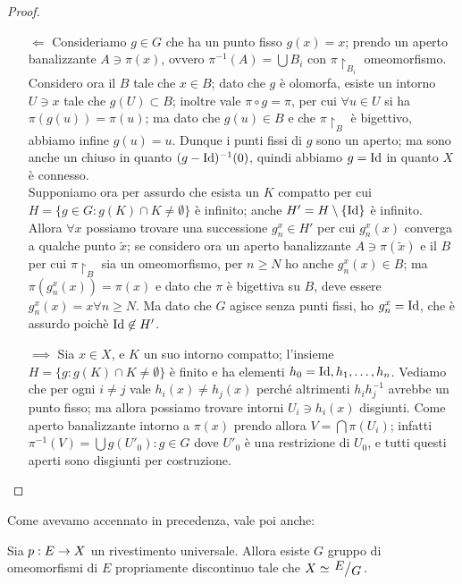 \begin{proof}$ $\\
\begin{itemize}
    \item[$\Longleftarrow$]Consideriamo $g\in G$ che ha un punto fisso $g(x)=x$; prendo un aperto banalizzante $A\ni \pi(x)$, ovvero $\pi^{-1}(A)=\bigcup B_i$ con $\pi\restriction_{B_i}$ omeomorfismo. Considero ora il $B$ tale che $x\in B$; dato che $g$ è olomorfa, esiste un intorno $U\ni x$ tale che $g(U)\subset B$; inoltre vale $\pi\circ g=\pi$, per cui $\forall u\in U$ si ha $\pi(g(u))=\pi(u)$; ma dato che $g(u)\in B$ e che $\pi\restriction_B$ è bigettivo, abbiamo infine $g(u)=u$. Dunque i punti fissi di $g$ sono un aperto; ma sono anche un chiuso in quanto $(g-\text{Id})^{-1}(0)$, quindi abbiamo $g=\text{Id}$ in quanto $X$ è connesso.\\
    Supponiamo ora per assurdo che esista un $K$ compatto per cui $H=\{ g\in G : g(K)\cap K\neq\emptyset \}$ è infinito; anche $H'=H\setminus\{\text{Id}\}$ è infinito. Allora $\forall x$ possiamo trovare una successione $g^x_n\in H'$ per cui $g^x_n(x)$ converga a qualche punto $\tilde x$; se considero ora un aperto banalizzante $A\ni\pi(\tilde x)$ e il $B$ per cui $\pi\restriction_B$ sia un omeomorfismo, per $n\ge N$ ho anche $g^x_n(x)\in B$; ma $\pi(g^x_n(x))=\pi(x)$ e dato che $\pi$ è bigettiva su $B$, deve essere $g^x_n(x)=x\forall n\ge N$. Ma dato che $G$ agisce senza punti fissi, ho $g^x_n=\text{Id}$, che è assurdo poichè $\text{Id}\not\in H'$.\\
    \item[$\implies$] Sia $x\in X$, e $K$ un suo intorno compatto; l'insieme $H=\{ g : g(K)\cap K\neq\emptyset\}$ è finito e ha elementi $h_0=\text{Id},h_1,\dots,h_n$. Vediamo che per ogni $i\neq j$ vale $h_i(x)\neq h_j(x)$ perché altrimenti $h_ih_j^{-1}$ avrebbe un punto fisso; ma allora possiamo trovare intorni $U_i\ni h_i(x)$ disgiunti. Come aperto banalizzante intorno a $\pi(x)$ prendo allora $V=\bigcap \pi(U_i)$; infatti $\pi^{-1}(V)=\bigcup{g(U'_0) : g\in G}$ dove $U'_0$ è una restrizione di $U_0$, e tutti questi aperti sono disgiunti per costruzione.
\end{itemize}
\end{proof}

Come avevamo accennato in precedenza, vale poi anche:

\begin{teorema} \label{rivuniv}
 	Sia $p:E\rightarrow X$ un rivestimento universale. Allora esiste $G$ gruppo di omeomorfismi di $E$ propriamente discontinuo tale che $X\isom\quotient{E}{G}$.
\end{teorema}


